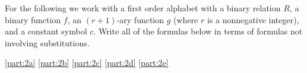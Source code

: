 \documentclass[boxes,pages,color=CornflowerBlue]{homework}
\begin{document}
\begin{problem}
For the following we work with a first order alphabet with a binary relation $R$, a binary function $f$, an $(r+1)$-ary function $g$ (where $r$ is a nonnegative integer), and a constant symbol $c$.
Write all of the formulas below in terms of formulas not involving substitutions.
\end{problem}

\begin{solution}
    \ref{part:2a}
    \ref{part:2b}
    \ref{part:2c}
    \ref{part:2d}
    \ref{part:2e}
\end{solution}
\end{document}
